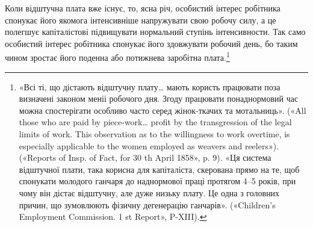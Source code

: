 Коли відштучна плата вже існує, то, ясна річ, особистий інтерес
робітника спонукає його якомога інтенсивніше напружувати
свою робочу силу, а це полегшує капіталістові підвищувати нормальний
ступінь інтенсивности. Так само особистий інтерес
робітника спонукає його здовжувати робочий день, бо таким
чином зростає його поденна або потижнева заробітна плата.\footnote{
«Всі ті, що дістають відштучну плату\dots{} мають користь працювати
поза визначені законом меніі робочого дня. Згоду працювати понаднормовий
час можна спостерігати особливо часто серед жінок-ткачих та мотальниць».
(«All those who are paid by piece-work\dots{} profit by the transgression
of the legal limits of work. This observation as to the willingness
to work overtime, is especially applicable to the women employed as weavers
and reelers»). («Reports of Insp. of Fact, for 30 th April 1858», p. 9).
«Ця система відштучної плати, така корисна для капіталіста, скерована
прямо на те, щоб спонукати молодого ганчаря до наднормової праці
протягом 4--5 років, при чому він дістає відштучну, але дуже низьку плату.
Це одна з головних причин, що зумовлюють фізичну дегенерацію ганчарів».
(«Children’s Employment Commission. 1 st Report», P-XIII).
}
\parbreak{}  %
